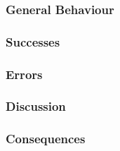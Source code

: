 \documentclass{acm_proc_article-sp}
\begin{document}
\subsubsection{General Behaviour}
\subsubsection{Successes}
\subsubsection{Errors}
\subsubsection{Discussion}
\subsubsection{Consequences}
\end{document}
